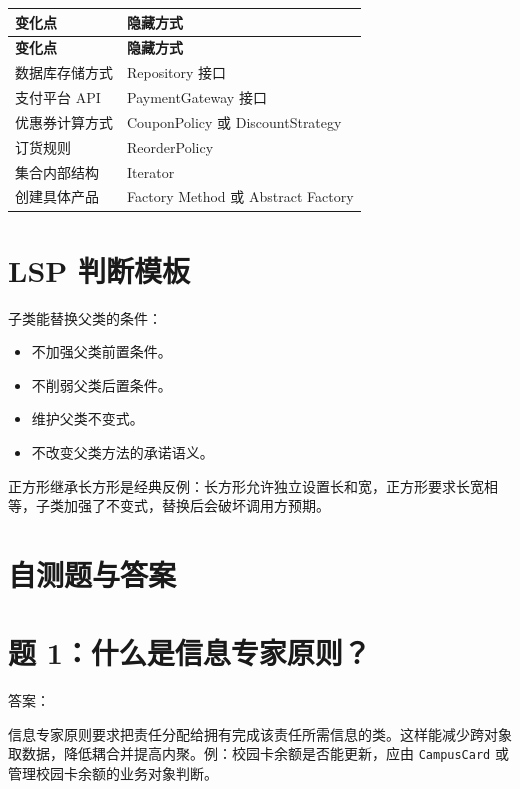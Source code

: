 \documentclass[UTF8,zihao=-4]{ctexart}
\begin{document}
{
\footnotesize
\begin{longtable}{|>{\raggedright\arraybackslash}p{}|>{\raggedright\arraybackslash}p{}|}
\hline
\textbf{变化点} & \textbf{隐藏方式} \\
\hline
\endfirsthead
\hline
\textbf{变化点} & \textbf{隐藏方式} \\
\hline
\endhead
数据库存储方式 & Repository 接口 \\
\hline
支付平台 API & PaymentGateway 接口 \\
\hline
优惠券计算方式 & CouponPolicy 或 DiscountStrategy \\
\hline
订货规则 & ReorderPolicy \\
\hline
集合内部结构 & Iterator \\
\hline
创建具体产品 & Factory Method 或 Abstract Factory \\
\hline
\end{longtable}
}


\section{LSP 判断模板}

子类能替换父类的条件：

\begin{itemize}
\item 不加强父类前置条件。
\item 不削弱父类后置条件。
\item 维护父类不变式。
\item 不改变父类方法的承诺语义。
\end{itemize}

正方形继承长方形是经典反例：长方形允许独立设置长和宽，正方形要求长宽相等，子类加强了不变式，替换后会破坏调用方预期。

\section{自测题与答案}

\section{题 1：什么是信息专家原则？}

答案：

信息专家原则要求把责任分配给拥有完成该责任所需信息的类。这样能减少跨对象取数据，降低耦合并提高内聚。例：校园卡余额是否能更新，应由 \texttt{CampusCard} 或管理校园卡余额的业务对象判断。
\end{document}
